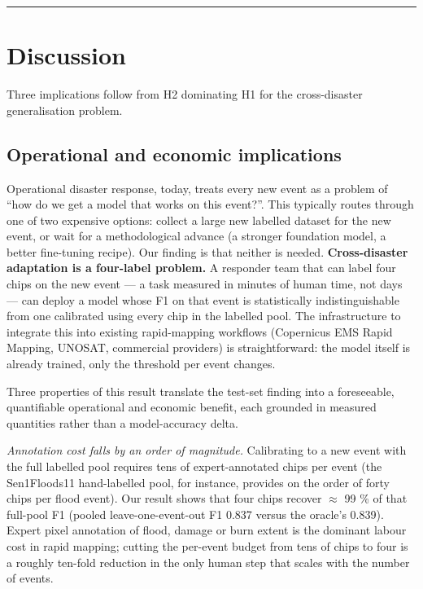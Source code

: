 \documentclass[sn-nature,lineno]{sn-jnl}
\theoremstyle{thmstyleone}
\theoremstyle{thmstyletwo}
\theoremstyle{thmstylethree}
\begin{document}
\begin{center}\rule{0.5\linewidth}{0.5pt}\end{center}

\section{Discussion}\label{discussion}

Three implications follow from H2 dominating H1 for the cross-disaster
generalisation problem.

\subsection{Operational and economic implications}\label{operational-and-economic-implications}

Operational disaster response, today, treats every new event as a
problem of ``how do we get a model that works on this event?''. This
typically routes through one of two expensive options: collect a large
new labelled dataset for the new event, or wait for a methodological
advance (a stronger foundation model, a better fine-tuning recipe). Our
finding is that neither is needed. \textbf{Cross-disaster adaptation is a
four-label problem.} A responder team that can label four chips on the
new event --- a task measured in minutes of human time, not days --- can
deploy a model whose F1 on that event is statistically indistinguishable
from one calibrated using every chip in the labelled pool. The
infrastructure to integrate this into existing rapid-mapping workflows
(Copernicus EMS Rapid Mapping, UNOSAT, commercial providers) is
straightforward: the model itself is already trained, only the
threshold per event changes.

Three properties of this result translate the test-set finding into a
foreseeable, quantifiable operational and economic benefit, each
grounded in measured quantities rather than a model-accuracy delta.

\emph{Annotation cost falls by an order of magnitude.} Calibrating to a new
event with the full labelled pool requires tens of expert-annotated
chips per event (the Sen1Floods11 hand-labelled pool, for instance,
provides on the order of forty chips per flood event). Our result shows
that four chips recover $\approx$ 99 \% of that full-pool F1 (pooled
leave-one-event-out F1 0.837 versus the oracle's 0.839). Expert pixel
annotation of flood, damage or burn extent is the dominant labour cost
in rapid mapping; cutting the per-event budget from tens of chips to
four is a roughly ten-fold reduction in the only human step that scales
with the number of events.
\end{document}

